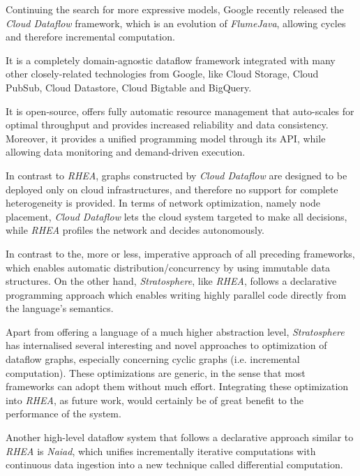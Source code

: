 \documentclass{dithesis}
\begin{document}


Continuing the search for more expressive models, Google recently released the \textit{Cloud Dataflow} framework\cite{google_dataflow}, which is an evolution of \textit{FlumeJava}\cite{flumejava}, allowing cycles and therefore incremental computation.

It is a completely domain-agnostic dataflow framework integrated with many other closely-related technologies from Google, like Cloud Storage, Cloud PubSub, Cloud Datastore, Cloud Bigtable and BigQuery. 

It is open-source, offers fully automatic resource management that auto-scales for optimal throughput and provides increased reliability and data consistency. Moreover, it provides a unified programming model through its API, while allowing data monitoring and demand-driven execution.

In contrast to \textit{RHEA}, graphs constructed by \textit{Cloud Dataflow} are designed to be deployed only on cloud infrastructures, and therefore no support for complete heterogeneity is provided. In terms of network optimization, namely node placement,  \textit{Cloud Dataflow} lets the cloud system targeted to make all decisions, while \textit{RHEA} profiles the network and decides autonomously. 


In contrast to the, more or less, imperative approach of all preceding frameworks, which enables automatic distribution/concurrency by using immutable data structures. On the other hand, \textit{Stratosphere}\cite{stratosphere}, like \textit{RHEA}, follows a declarative programming approach which enables writing highly parallel code directly from the language's semantics. 

Apart from offering a language of a much higher abstraction level, \textit{Stratosphere} has internalised several interesting and novel approaches to optimization of dataflow graphs, especially concerning cyclic graphs (i.e. incremental computation)\cite{spinning}. These optimizations are generic, in the sense that most frameworks can adopt them without much effort. Integrating these optimization into \textit{RHEA}, as future work, would certainly be of great benefit to the performance of the system.


Another high-level dataflow system that follows a declarative approach similar to \textit{RHEA} is \textit{Naiad}, which unifies incrementally iterative computations with continuous data ingestion into a new
technique called differential computation.
\end{document}
